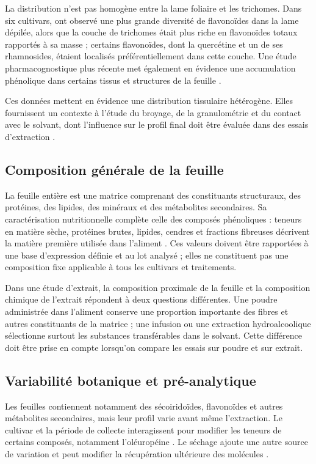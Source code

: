 La distribution n'est pas homogène entre la lame foliaire et les trichomes. Dans six cultivars, \citet{Liakopoulos2006} ont observé une plus grande diversité de flavonoïdes dans la lame dépilée, alors que la couche de trichomes était plus riche en flavonoïdes totaux rapportés à sa masse ; certains flavonoïdes, dont la quercétine et un de ses rhamnosides, étaient localisés préférentiellement dans cette couche. Une étude pharmacognostique plus récente met également en évidence une accumulation phénolique dans certains tissus et structures de la feuille \citep{Betuzzi2025}.

Ces données mettent en évidence une distribution tissulaire hétérogène. Elles fournissent un contexte à l'étude du broyage, de la granulométrie et du contact avec le solvant, dont l'influence sur le profil final doit être évaluée dans des essais d'extraction \citep{Debs2023}.

\subsection{Composition générale de la feuille}

La feuille entière est une matrice comprenant des constituants structuraux, des protéines, des lipides, des minéraux et des métabolites secondaires. Sa caractérisation nutritionnelle complète celle des composés phénoliques : teneurs en matière sèche, protéines brutes, lipides, cendres et fractions fibreuses décrivent la matière première utilisée dans l'aliment \citep{Rezar2025}. Ces valeurs doivent être rapportées à une base d'expression définie et au lot analysé ; elles ne constituent pas une composition fixe applicable à tous les cultivars et traitements.

Dans une étude d'extrait, la composition proximale de la feuille et la composition chimique de l'extrait répondent à deux questions différentes. Une poudre administrée dans l'aliment conserve une proportion importante des fibres et autres constituants de la matrice ; une infusion ou une extraction hydroalcoolique sélectionne surtout les substances transférables dans le solvant. Cette différence doit être prise en compte lorsqu'on compare les essais sur poudre et sur extrait.

\subsection{Variabilité botanique et pré-analytique}

Les feuilles contiennent notamment des sécoiridoïdes, flavonoïdes et autres métabolites secondaires, mais leur profil varie avant même l'extraction. Le cultivar et la période de collecte interagissent pour modifier les teneurs de certains composés, notamment l'oléuropéine \citep{Paskovic2025}. Le séchage ajoute une autre source de variation et peut modifier la récupération ultérieure des molécules \citep{CorAndrejc2022}.

